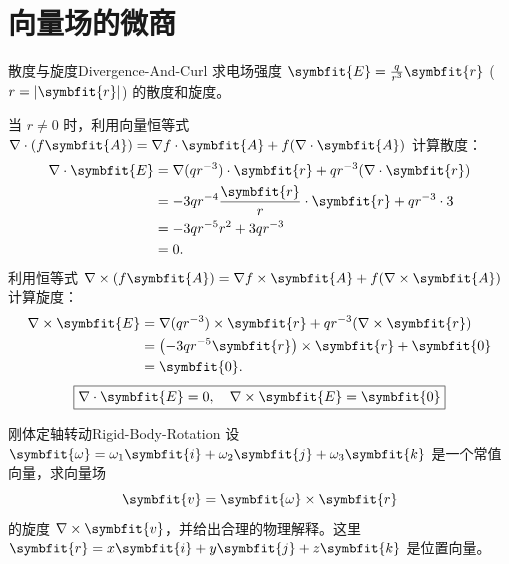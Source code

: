 \section{向量场的微商}

\begin{problem}{散度与旋度}{Divergence-And-Curl}
    求电场强度 $\symbfit{E} = \frac{q}{r^3} \symbfit{r}$ ($r = |\symbfit{r}|$) 的散度和旋度。
\end{problem}

\begin{solution}
    当 $r \neq 0$ 时，利用向量恒等式 $\nabla \cdot (f \symbfit{A}) = \nabla f \cdot \symbfit{A} + f (\nabla \cdot \symbfit{A})$ 计算散度：
    \begin{equation}
        \begin{aligned}
            \nabla \cdot \symbfit{E} & = \nabla (q r^{-3}) \cdot \symbfit{r} + q r^{-3} (\nabla \cdot \symbfit{r}) \\
                                     & = -3q r^{-4} \frac{\symbfit{r}}{r} \cdot \symbfit{r} + q r^{-3} \cdot 3     \\
                                     & = -3q r^{-5} r^2 + 3q r^{-3}                                                \\
                                     & = 0.
        \end{aligned} \label{eq:divergence-calc}
    \end{equation}
    利用恒等式 $\nabla \times (f \symbfit{A}) = \nabla f \times \symbfit{A} + f (\nabla \times \symbfit{A})$ 计算旋度：
    \begin{equation}
        \begin{aligned}
            \nabla \times \symbfit{E} & = \nabla (q r^{-3}) \times \symbfit{r} + q r^{-3} (\nabla \times \symbfit{r}) \\
                                      & = \left( -3q r^{-5} \symbfit{r} \right) \times \symbfit{r} + \symbfit{0}      \\
                                      & = \symbfit{0}.
        \end{aligned} \label{eq:curl-calc}
    \end{equation}
    \begin{equation}
        \boxed{\nabla \cdot \symbfit{E} = 0, \quad \nabla \times \symbfit{E} = \symbfit{0}}
    \end{equation}
\end{solution}

\begin{problem}{刚体定轴转动}{Rigid-Body-Rotation}
    设 $\symbfit{\omega} = \omega_1 \symbfit{i} + \omega_2 \symbfit{j} + \omega_3 \symbfit{k}$ 是一个常值向量，求向量场
    \begin{equation}
        \symbfit{v} = \symbfit{\omega} \times \symbfit{r}
    \end{equation}
    的旋度 $\nabla \times \symbfit{v}$，并给出合理的物理解释。这里 $\symbfit{r} = x \symbfit{i} + y \symbfit{j} + z \symbfit{k}$ 是位置向量。
\end{problem}

